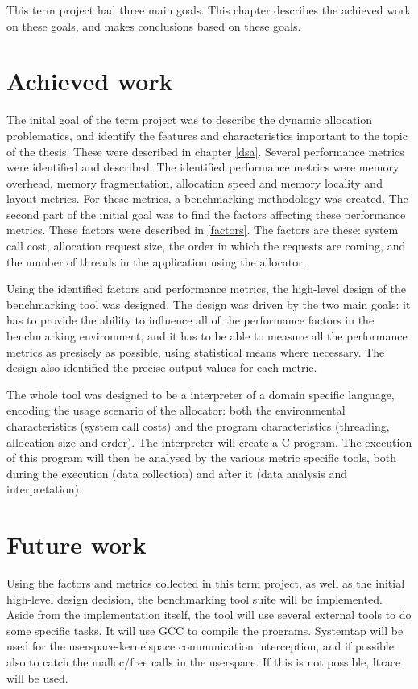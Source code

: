 This term project had three main goals. This chapter describes the achieved work on these goals, and makes conclusions based on these goals.

\section{Achieved work}

The inital goal of the term project was to describe the dynamic allocation problematics, and identify the features and characteristics important to the topic of the thesis. These were described in chapter \ref{dsa}. Several performance metrics were identified and described. The identified performance metrics were memory overhead, memory fragmentation, allocation speed and memory locality and layout metrics. For these metrics, a benchmarking methodology was created. The second part of the initial goal was to find the factors affecting these performance metrics. These factors were described in \ref{factors}. The factors are these: system call cost, allocation request size, the order in which the requests are coming, and the number of threads in the application using the allocator.

Using the identified factors and performance metrics, the high-level design of the benchmarking tool was designed. The design was driven by the two main goals: it has to provide the ability to influence all of the performance factors in the benchmarking environment, and it has to be able to measure all the performance metrics as presisely as possible, using statistical means where necessary. The design also identified the precise output values for each metric. 

The whole tool was designed to be a interpreter of a domain specific language, encoding the usage scenario of the allocator: both the environmental characteristics (system call costs) and the program characteristics (threading, allocation size and order). The interpreter will create a C program. The execution of this program will then be analysed by the various metric specific tools, both during the execution (data collection) and after it (data analysis and interpretation).

\section{Future work}

Using the factors and metrics collected in this term project, as well as the initial high-level design decision, the benchmarking tool suite will be implemented. Aside from the implementation itself, the tool will use several external tools to do some specific tasks. It will use GCC to compile the programs. Systemtap will be used for the userspace-kernelspace communication interception, and if possible also to catch the malloc/free calls in the userspace. If this is not possible, ltrace will be used.

